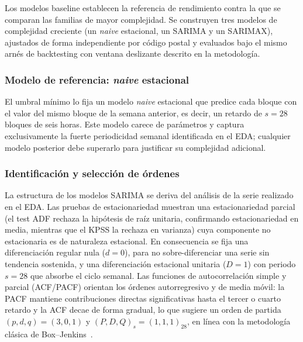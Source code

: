 \documentclass[12pt, a4paper]{article}
\begin{document}
Los modelos baseline establecen la referencia de rendimiento contra la que se comparan las familias de mayor complejidad. Se construyen tres modelos de complejidad creciente (un \textit{naive} estacional, un SARIMA y un SARIMAX), ajustados de forma independiente por código postal y evaluados bajo el mismo arnés de backtesting con ventana deslizante descrito en la metodología.

\subsubsection{Modelo de referencia: \textit{naive} estacional}

El umbral mínimo lo fija un modelo \textit{naive} estacional que predice cada bloque con el valor del mismo bloque de la semana anterior, es decir, un retardo de $s=28$ bloques de seis horas. Este modelo carece de parámetros y captura exclusivamente la fuerte periodicidad semanal identificada en el EDA; cualquier modelo posterior debe superarlo para justificar su complejidad adicional.

\subsubsection{Identificación y selección de órdenes}

La estructura de los modelos SARIMA se deriva del análisis de la serie realizado en el EDA. Las pruebas de estacionariedad muestran una estacionariedad parcial (el test ADF rechaza la hipótesis de raíz unitaria, confirmando estacionariedad en media, mientras que el KPSS la rechaza en varianza) cuya componente no estacionaria es de naturaleza estacional. En consecuencia se fija una diferenciación regular nula ($d=0$), para no sobre-diferenciar una serie sin tendencia sostenida, y una diferenciación estacional unitaria ($D=1$) con periodo $s=28$ que absorbe el ciclo semanal. Las funciones de autocorrelación simple y parcial (ACF/PACF) orientan los órdenes autorregresivo y de media móvil: la PACF mantiene contribuciones directas significativas hasta el tercer o cuarto retardo y la ACF decae de forma gradual, lo que sugiere un orden de partida $(p,d,q)=(3,0,1)$ y $(P,D,Q)_s=(1,1,1)_{28}$, en línea con la metodología clásica de Box--Jenkins~\cite{boxjenkins2015}.
\end{document}
